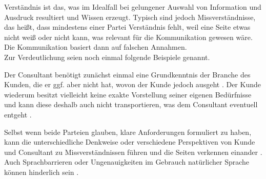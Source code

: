 \documentclass[../main.tex]{subfiles}
\begin{document}
Verständnis ist das, was im Idealfall bei gelungener Auswahl von Information und Ausdruck resultiert und Wissen erzeugt.
Typisch sind jedoch Missverständnisse, das heißt, dass mindestens einer Partei Verständnis fehlt, weil eine Seite etwas nicht weiß oder nicht kann, was relevant für die Kommunikation gewesen wäre.
Die Kommunikation basiert dann auf falschen Annahmen. 
\\
Zur Verdeutlichung seien noch einmal folgende Beispiele genannt. 

Der Consultant benötigt zunächst einmal eine Grundkenntnis der Branche des Kunden, die er ggf. aber nicht hat, wovon der Kunde jedoch ausgeht \autocite{appelbaum2005critical,davis2006communication,gamil2017identification,sutter2019consultants}.
Der Kunde wiederum besitzt vielleicht keine exakte Vorstellung seiner eigenen Bedürfnisse und kann diese deshalb auch nicht transportieren, was dem Consultant eventuell entgeht \autocite{davis2006communication}.

Selbst wenn beide Parteien glauben, klare Anforderungen formuliert zu haben, kann die unterschiedliche Denkweise oder verschiedene Perspektiven von Kunde und Consultant zu Missverständnissen führen und die Seiten verkennen einander \autocite{sutter2019consultants}.
Auch Sprachbarrieren oder Ungenauigkeiten im Gebrauch natürlicher Sprache können hinderlich sein \autocite{gamil2017identification,sayer2013misunderstanding}.
\end{document}

